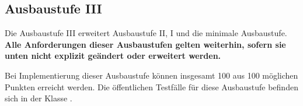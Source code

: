 \subsection{Ausbaustufe III}

Die Ausbaustufe III erweitert Ausbaustufe II, I und die minimale
Ausbaustufe. \textbf{Alle Anforderungen dieser Ausbaustufen gelten
  weiterhin, sofern sie unten nicht explizit ge\"andert oder erweitert
  werden.}

Bei Implementierung dieser Ausbaustufe k\"onnen insgesamt 100 aus 100
m\"oglichen Punkten erreicht werden. Die \"offentlichen Testf\"alle
f\"ur diese Ausbaustufe befinden sich in der Klasse \texttt{\testLvC}.

